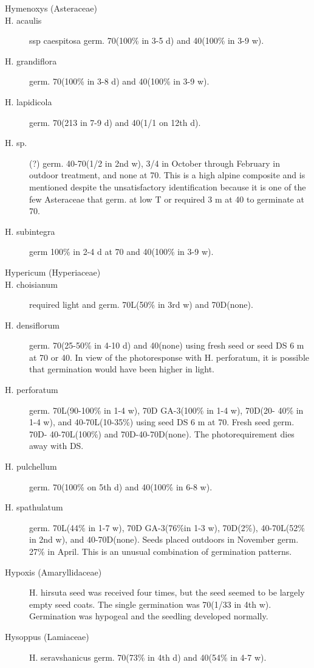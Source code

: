 \begin{description}
\item[Hymenoxys (Asteraceae)]
\item[H. acaulis] ssp caespitosa germ. 70(100\% in 3-5 d) and 40(100\% in 3-9 w).
\item[H. grandiflora] germ. 70(100\% in 3-8 d) and 40(100\% in 3-9 w).
\item[H. lapidicola] germ. 70(213 in 7-9 d) and 40(1/1 on 12th d).
\item[H. sp.] (?) germ. 40-70(1/2 in 2nd w), 3/4 in October through February in outdoor
treatment, and none at 70. This is a high alpine composite and is mentioned despite
the unsatisfactory identification because it is one of the few Asteraceae that germ. at
low T or required 3 m at 40 to germinate at 70.
\item[H. subintegra] germ 100\% in 2-4 d at 70 and 40(100\% in 3-9 w).

\item[Hypericum (Hyperiaceae)]
\item[H. choisianum] required light and germ. 70L(50\% in 3rd w) and 70D(none).
\item[H. densiflorum] germ. 70(25-50\% in 4-10 d) and 40(none) using fresh seed or
seed DS 6 m at 70 or 40. In view of the photoresponse with H. perforatum, it is
possible that germination would have been higher in light.
\item[H. perforatum] germ. 70L(90-100\% in 1-4 w), 70D GA-3(100\% in 1-4 w), 70D(20-
40\% in 1-4 w), and 40-70L(10-35\%) using seed DS 6 m at 70. Fresh seed germ. 70D-
40-70L(100\%) and 70D-40-70D(none). The photorequirement dies away with DS.
\item[H. pulchellum] germ. 70(100\% on 5th d) and 40(100\% in 6-8 w).
\item[H. spathulatum] germ. 70L(44\% in 1-7 w), 70D GA-3(76\%in 1-3 w), 70D(2\%),
40-70L(52\% in 2nd w), and 40-70D(none). Seeds placed outdoors in November
germ. 27\% in April. This is an unusual combination of germination patterns.

\item[Hypoxis (Amaryllidaceae)] H. hirsuta seed was received four times, but the
seed seemed to be largely empty seed coats. The single germination was 70(1/33 in
4th w). Germination was hypogeal and the seedling developed normally.
\item[Hysoppus (Lamiaceae)] H. seravshanicus germ. 70(73\% in 4th d) and
40(54\% in 4-7 w).

\end{description}
